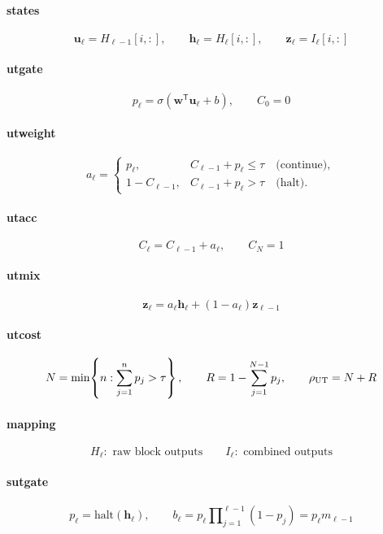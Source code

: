 \documentclass{article}
\begin{document}
\paragraph{states}
\[
\mathbf{u}_{\ell}=H_{\ell-1}[i,:],\qquad \mathbf{h}_{\ell}=H_{\ell}[i,:],\qquad \mathbf{z}_{\ell}=I_{\ell}[i,:]
\]

\paragraph{utgate}
\[
p_{\ell}=\sigma(\mathbf{w}^{\mathsf T}\mathbf{u}_{\ell}+b),\qquad C_0=0
\]

\paragraph{utweight}
\[
a_{\ell}=\begin{cases}p_{\ell},&C_{\ell-1}+p_{\ell}\leq\tau\quad\text{(continue)},\\1-C_{\ell-1},&C_{\ell-1}+p_{\ell}>\tau\quad\text{(halt)}.\end{cases}
\]

\paragraph{utacc}
\[
C_{\ell}=C_{\ell-1}+a_{\ell},\qquad C_N=1
\]

\paragraph{utmix}
\[
\mathbf{z}_{\ell}=a_{\ell}\mathbf{h}_{\ell}+(1-a_{\ell})\mathbf{z}_{\ell-1}
\]

\paragraph{utcost}
\[
N=\min\!\left\{n:\sum_{j=1}^{n}p_j>\tau\right\},\qquad R=1-\sum_{j=1}^{N-1}p_j,\qquad\rho_{\rm UT}=N+R
\]

\paragraph{mapping}
\[
H_{\ell}:\text{ raw block outputs}\qquad I_{\ell}:\text{ combined outputs}
\]

\paragraph{sutgate}
\[
p_{\ell}=\mathrm{halt}(\mathbf{h}_{\ell}),\qquad b_{\ell}=p_{\ell}\prod\nolimits_{j=1}^{\ell-1}(1-p_j)=p_{\ell}m_{\ell-1}
\]
\end{document}
